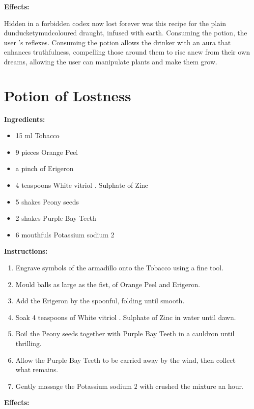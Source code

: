 \documentclass{article}
\begin{document}
\textbf{Effects:}

Hidden in a forbidden codex now lost forever was this recipe for the plain dunducketymudcoloured draught, infused with earth. Consuming the potion, the user 's reflexes. Consuming the potion allows the drinker with an aura that enhances truthfulness, compelling those around them to rise anew from their own dreams, allowing the user can manipulate plants and make them grow.

\newpage
\section*{Potion of Lostness}

\textbf{Ingredients:}

\begin{itemize}
  \item 15 ml Tobacco
  \item 9 pieces Orange Peel
  \item a pinch of Erigeron
  \item 4 teaspoons White vitriol . Sulphate of Zinc
  \item 5 shakes Peony seeds
  \item 2 shakes Purple Bay Teeth
  \item 6 mouthfuls Potassium sodium 2
\end{itemize}

\textbf{Instructions:}

\begin{enumerate}
  \item Engrave symbols of the armadillo onto the Tobacco using a fine tool.
  \item Mould balls as large as the fist, of Orange Peel and Erigeron.
  \item Add the Erigeron by the spoonful, folding until smooth.
  \item Soak 4 teaspoons of White vitriol . Sulphate of Zinc in water until dawn.
  \item Boil the Peony seeds together with Purple Bay Teeth in a cauldron until thrilling.
  \item Allow the Purple Bay Teeth to be carried away by the wind, then collect what remains.
  \item Gently massage the Potassium sodium 2 with crushed the mixture an hour.
\end{enumerate}

\textbf{Effects:}
\end{document}
